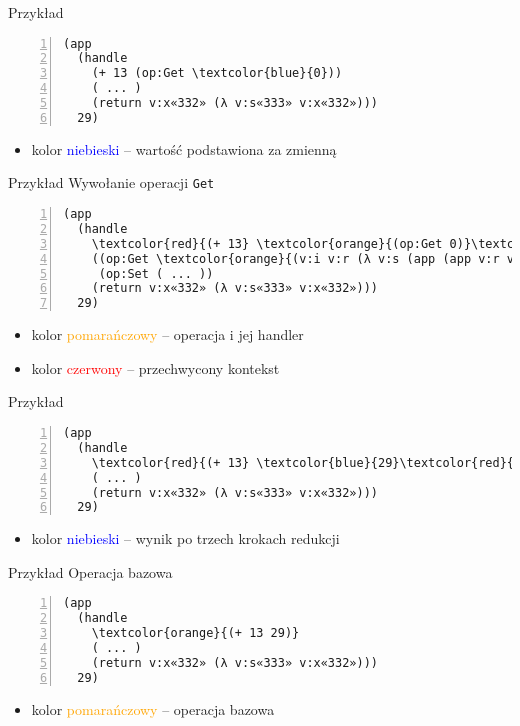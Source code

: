 \documentclass{beamer}
\begin{document}
\begin{frame}[fragile]{Przykład}
\begin{Verbatim}[commandchars=\\\{\},numbers=left]
(app
  (handle
    (+ 13 (op:Get \textcolor{blue}{0}))
    ( ... )
    (return v:x«332» (λ v:s«333» v:x«332»)))
  29)
\end{Verbatim}
\begin{itemize}
  \item kolor \textcolor{blue}{niebieski} -- wartość podstawiona za zmienną
\end{itemize}
\end{frame}

\begin{frame}[fragile]{Przykład}
Wywołanie operacji \texttt{Get}
\begin{Verbatim}[commandchars=\\\{\},numbers=left]
(app
  (handle
    \textcolor{red}{(+ 13} \textcolor{orange}{(op:Get 0)}\textcolor{red}{)}
    ((op:Get \textcolor{orange}{(v:i v:r (λ v:s (app (app v:r v:s) v:s)))})
     (op:Set ( ... ))
    (return v:x«332» (λ v:s«333» v:x«332»)))
  29)
\end{Verbatim}
\begin{itemize}
  \item kolor \textcolor{orange}{pomarańczowy} -- operacja i jej handler
  \item kolor \textcolor{red}{czerwony} -- przechwycony kontekst
\end{itemize}
\end{frame}

\begin{frame}[fragile]{Przykład}
\begin{Verbatim}[commandchars=\\\{\},numbers=left]
(app
  (handle
    \textcolor{red}{(+ 13} \textcolor{blue}{29}\textcolor{red}{)}
    ( ... )
    (return v:x«332» (λ v:s«333» v:x«332»)))
  29)
\end{Verbatim}
\begin{itemize}
  \item kolor \textcolor{blue}{niebieski} -- wynik po trzech krokach redukcji
\end{itemize}
\end{frame}

\begin{frame}[fragile]{Przykład}
Operacja bazowa
\begin{Verbatim}[commandchars=\\\{\},numbers=left]
(app
  (handle
    \textcolor{orange}{(+ 13 29)}
    ( ... )
    (return v:x«332» (λ v:s«333» v:x«332»)))
  29)
\end{Verbatim}
\begin{itemize}
  \item kolor \textcolor{orange}{pomarańczowy} -- operacja bazowa
\end{itemize}
\end{frame}
\end{document}
